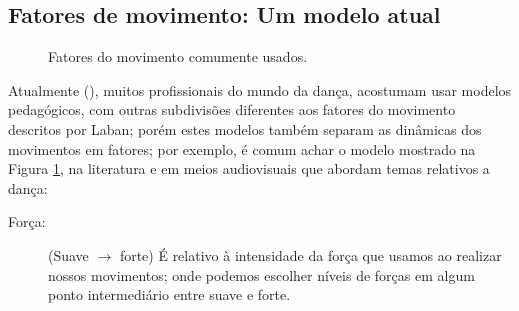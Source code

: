 \subsection{Fatores de movimento: Um modelo atual}
\label{subsec:fator:movimento:atual}
\begin{figure}
\centering
{} 
\caption{Fatores do movimento comumente usados.}
\label{fig:fatores:moviemnto:popular}
\end{figure}
Atualmente (\AnoLivro), muitos profissionais do mundo da dança, 
 acostumam usar modelos pedagógicos, 
com outras subdivisões diferentes aos fatores do movimento descritos por Laban; 
porém estes modelos também separam as dinâmicas dos movimentos em fatores;
por exemplo, é comum achar o modelo  mostrado na Figura \ref{fig:fatores:moviemnto:popular},
na literatura \cite[pp. 30]{paine2014complete} \cite[pp. 181]{smith2014dance}
e em meios audiovisuais que abordam temas relativos a dança:

\begin{description}
\item[Força:] (Suave $\rightarrow$ forte) 
É relativo à intensidade da força que usamos ao realizar nossos movimentos;
onde podemos escolher níveis de forças em algum ponto intermediário entre suave e forte. 
\end{description}


